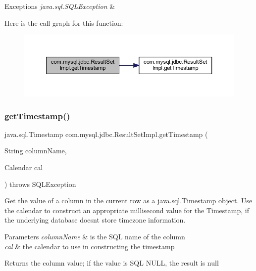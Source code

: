 \begin{DoxyExceptions}{Exceptions}
{\em java.\+sql.\+S\+Q\+L\+Exception} & \\
\hline
\end{DoxyExceptions}
Here is the call graph for this function\+:
\nopagebreak
\begin{figure}[H]
\begin{center}
\leavevmode
\includegraphics[width=350pt]{classcom_1_1mysql_1_1jdbc_1_1_result_set_impl_ab59180f7dee8a2c4f89a30d6d9140e3e_cgraph}
\end{center}
\end{figure}
\mbox{\label{classcom_1_1mysql_1_1jdbc_1_1_result_set_impl_aea1f8033f50dc70c022687e65fe1b570}} 
\subsubsection{\texorpdfstring{get\+Timestamp()}{getTimestamp()}\hspace{0.1cm}{\footnotesize\ttfamily [4/4]}}
{\footnotesize\ttfamily java.\+sql.\+Timestamp com.\+mysql.\+jdbc.\+Result\+Set\+Impl.\+get\+Timestamp (\begin{DoxyParamCaption}\item[{String}]{column\+Name,  }\item[{Calendar}]{cal }\end{DoxyParamCaption}) throws S\+Q\+L\+Exception}

Get the value of a column in the current row as a java.\+sql.\+Timestamp object. Use the calendar to construct an appropriate millisecond value for the Timestamp, if the underlying database doesn\textquotesingle{}t store timezone information.


\begin{DoxyParams}{Parameters}
{\em column\+Name} & is the S\+QL name of the column \\
\hline
{\em cal} & the calendar to use in constructing the timestamp\\
\hline
\end{DoxyParams}
\begin{DoxyReturn}{Returns}
the column value; if the value is S\+QL N\+U\+LL, the result is null
\end{DoxyReturn}

